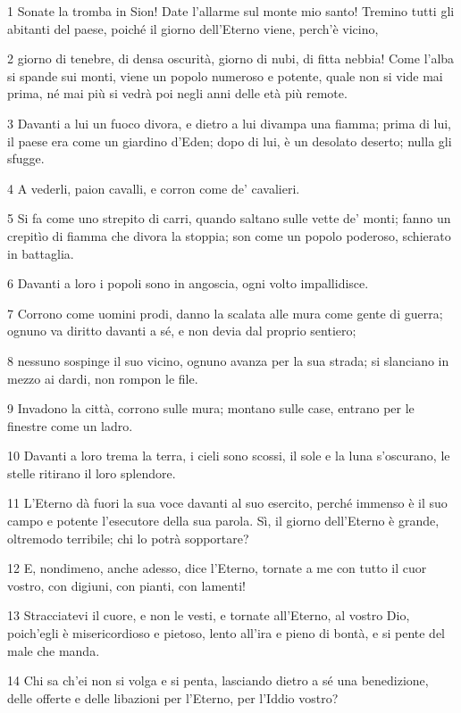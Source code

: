 \par 1 Sonate la tromba in Sion! Date l'allarme sul monte mio santo! Tremino tutti gli abitanti del paese, poiché il giorno dell'Eterno viene, perch'è vicino,
\par 2 giorno di tenebre, di densa oscurità, giorno di nubi, di fitta nebbia! Come l'alba si spande sui monti, viene un popolo numeroso e potente, quale non si vide mai prima, né mai più si vedrà poi negli anni delle età più remote.
\par 3 Davanti a lui un fuoco divora, e dietro a lui divampa una fiamma; prima di lui, il paese era come un giardino d'Eden; dopo di lui, è un desolato deserto; nulla gli sfugge.
\par 4 A vederli, paion cavalli, e corron come de' cavalieri.
\par 5 Si fa come uno strepito di carri, quando saltano sulle vette de' monti; fanno un crepitìo di fiamma che divora la stoppia; son come un popolo poderoso, schierato in battaglia.
\par 6 Davanti a loro i popoli sono in angoscia, ogni volto impallidisce.
\par 7 Corrono come uomini prodi, danno la scalata alle mura come gente di guerra; ognuno va diritto davanti a sé, e non devia dal proprio sentiero;
\par 8 nessuno sospinge il suo vicino, ognuno avanza per la sua strada; si slanciano in mezzo ai dardi, non rompon le file.
\par 9 Invadono la città, corrono sulle mura; montano sulle case, entrano per le finestre come un ladro.
\par 10 Davanti a loro trema la terra, i cieli sono scossi, il sole e la luna s'oscurano, le stelle ritirano il loro splendore.
\par 11 L'Eterno dà fuori la sua voce davanti al suo esercito, perché immenso è il suo campo e potente l'esecutore della sua parola. Sì, il giorno dell'Eterno è grande, oltremodo terribile; chi lo potrà sopportare?
\par 12 E, nondimeno, anche adesso, dice l'Eterno, tornate a me con tutto il cuor vostro, con digiuni, con pianti, con lamenti!
\par 13 Stracciatevi il cuore, e non le vesti, e tornate all'Eterno, al vostro Dio, poich'egli è misericordioso e pietoso, lento all'ira e pieno di bontà, e si pente del male che manda.
\par 14 Chi sa ch'ei non si volga e si penta, lasciando dietro a sé una benedizione, delle offerte e delle libazioni per l'Eterno, per l'Iddio vostro?
